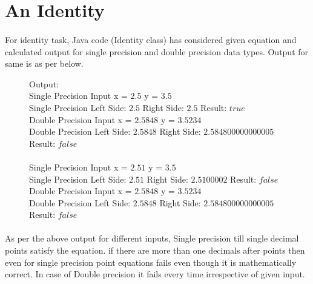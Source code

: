 \documentclass[12pt]{article}
\begin{document}
\newpage
\section{An Identity}
\paragraph{}For identity task, Java code (Identity class) has considered given equation and calculated output for single precision and double precision data types. Output for same is as per below. \\

\begin{figure}[h]
	Output:\\
	Single Precision Input x = $2.5$  y = $3.5$ \\
	Single Precision Left Side: $2.5$  Right Side: $2.5$  Result: $true$ \\
	Double Precision Input x = $2.5848$  y = $3.5234$ \\
	Double Precision Left Side: $2.5848$  Right Side:  $2.584800000000005$  Result: $false$ \\ \\
	Single Precision Input x = $2.51$  y = $3.5$ \\
	Single Precision Left Side: $2.51$  Right Side: $2.5100002$  Result: $false$ 
	Double Precision Input x = $2.5848$  y = $3.5234$ \\
	Double Precision Left Side: $2.5848$  Right Side: $2.584800000000005$  Result: $false$
\end{figure}

\paragraph{} As per the above output for different inputs, Single precision till single decimal points satisfy the equation. if there are more than one decimals after points then even for single precision point equations fails even though it is mathematically correct. In case of Double precision it fails every time irrespective of given input.
\end{document}
